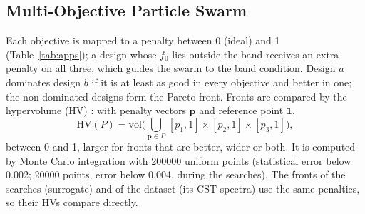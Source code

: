 \documentclass[journal]{IEEEtran}
\begin{document}
\subsection{Multi-Objective Particle Swarm}
Each objective is mapped to a penalty between 0 (ideal) and 1 (Table~\ref{tab:apps}); a design whose $f_0$ lies outside the band receives an extra penalty on all three, which guides the swarm to the band condition. Design $a$ dominates design $b$ if it is at least as good in every objective and better in one; the non-dominated designs form the Pareto front. Fronts are compared by the hypervolume (HV) \cite{zitzler_hv}: with penalty vectors $\mathbf p$ and reference point $\mathbf 1$,
\begin{equation}
\mathrm{HV}(P)=\mathrm{vol}\Big(\bigcup_{\mathbf p\in P}\,[p_1,1]\times[p_2,1]\times[p_3,1]\Big),
\label{eq:hv}
\end{equation}
between 0 and 1, larger for fronts that are better, wider or both. It is computed by Monte Carlo integration with \num{200000} uniform points (statistical error below 0.002; \num{20000} points, error below 0.004, during the searches). The fronts of the searches (surrogate) and of the dataset (its CST spectra) use the same penalties, so their HVs compare directly.
\end{document}
